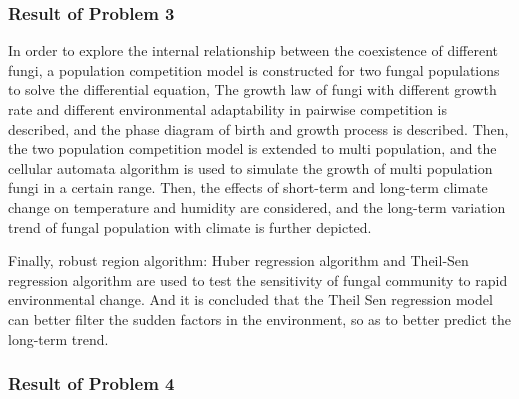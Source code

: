\documentclass{mcmthesis}
\begin{document}
\subsubsection*{Result of Problem 3}

In order to explore the internal relationship between the coexistence of different fungi, a population competition model is constructed for two fungal populations to solve the differential equation, The growth law of fungi with different growth rate and different environmental adaptability in pairwise competition is described, and the phase diagram of birth and growth process is described. Then, the two population competition model is extended to multi population, and the cellular automata algorithm is used to simulate the growth of multi population fungi in a certain range. Then, the effects of short-term and long-term climate change on temperature and humidity are considered, and the long-term variation trend of fungal population with climate is further depicted.

Finally, robust region algorithm: Huber regression algorithm and Theil-Sen regression algorithm are used to test the sensitivity of fungal community to rapid environmental change. And it is concluded that the Theil Sen regression model can better filter the sudden factors in the environment, so as to better predict the long-term trend.

\subsubsection*{Result of Problem 4}


\end{document}
